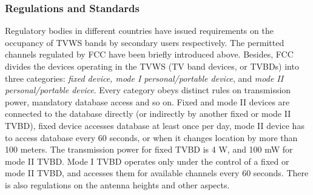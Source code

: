 \subsubsection{Regulations and Standards}

Regulatory bodies in different countries have issued requirements on the occupancy of TVWS bands by secondary users respectively. 
The permitted channels regulated by FCC have been briefly introduced above.
Besides, FCC divides the devices operating in the TVWS (TV band devices, or \glspl{TVBD}) into three categories: \textit{fixed device, mode I personal/portable device}, and \textit{mode II personal/portable device}. 
Every category obeys distinct rules on transmission power, mandatory database access and so on.
Fixed and mode II devices are connected to the database directly (or indirectly by another fixed or mode II TVBD), fixed device accesses database at least once per day, mode II device has to access database every 60 seconds, or when it changes location by more than 100 meters.
The transmission power for fixed TVBD is 4 W, and 100 mW for mode II TVBD. 
Mode I TVBD operates only under the control of a fixed or mode II TVBD, and accesses them for available channels every 60 seconds.
There is also regulations on the antenna heights and other aspects.

